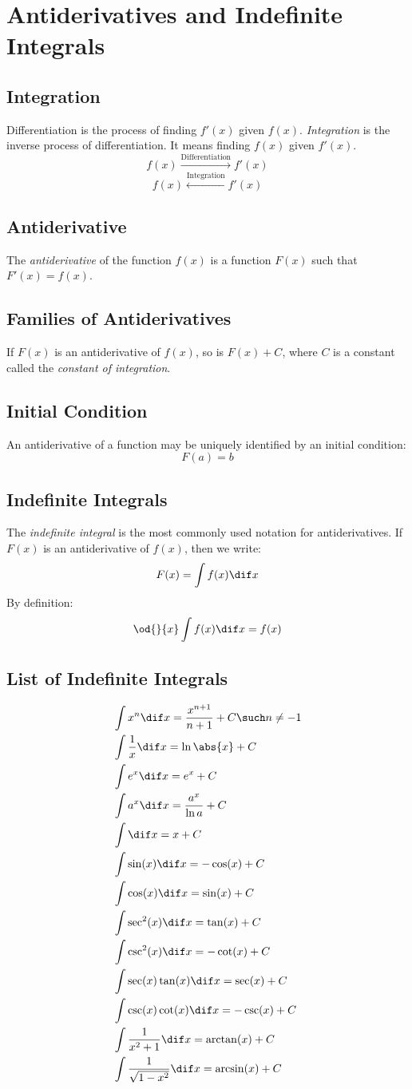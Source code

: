 \section{Antiderivatives and Indefinite Integrals}
\subsection{Integration}
	Differentiation is the process of finding $f'(x)$ given $f(x)$. \emph{Integration} is the inverse process of differentiation. It means finding $f(x)$ given $f'(x)$.
	\[f(x) \xrightarrow{\text{Differentiation}} f'(x)\]
	\[f(x) \xleftarrow{\text{Integration}} f'(x)\]
\subsection{Antiderivative}
	The \emph{antiderivative} of the function $f(x)$ is a function $F(x)$ such that $F'(x) = f(x)$.
\subsection{Families of Antiderivatives}
	If $F(x)$ is an antiderivative of $f(x)$, so is $F(x) + C$, where $C$ is a constant called the \emph{constant of integration}.
\subsection{Initial Condition}
	An antiderivative of a function may be uniquely identified by an initial condition:
	\[F(a) = b\]
\subsection{Indefinite Integrals}
	The \emph{indefinite integral} is the most commonly used notation for antiderivatives.
	If $F(x)$ is an antiderivative of $f(x)$, then we write:
	\[F(x) = \int f(x) \dif x\]
	By definition:
	\[\od{}{x} \int f(x) \dif x = f(x)\]
\subsection{List of Indefinite Integrals}\label{subsec:4.9:integrals}
	\begin{align*}
		&\int x^n \dif x = \frac{x^{n+1}}{n+1} + C \such n \neq -1\\
		&\int \frac{1}{x} \dif x = \ln \abs{x} + C\\
		&\int e^x \dif x = e^x + C\\
		&\int a^x \dif x = \frac{a^x}{\ln a} + C\\
		&\int \dif x = x + C\\
		&\int \sin(x) \dif x = -\cos(x) + C\\
		&\int \cos(x) \dif x = \sin(x) + C\\
		&\int \sec^2(x) \dif x = \tan(x) + C\\
		&\int \csc^2(x) \dif x = -\cot(x) + C\\
		&\int \sec(x) \tan(x) \dif x = \sec(x) + C\\
		&\int \csc(x) \cot(x) \dif x = -\csc(x) + C\\
		&\int \frac{1}{x^2 + 1} \dif x = \arctan(x) + C\\
		&\int \frac{1}{\sqrt{1 - x^2}} \dif x = \arcsin(x) + C
	\end{align*}
